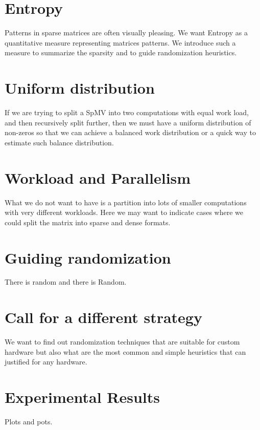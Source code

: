 \documentclass[manuscript,screen]{acmart}
\begin{document}
\section{Entropy}
Patterns in sparse matrices are often visually pleasing. We want
Entropy as a quantitative measure representing matrices patterns. We
introduce such a measure to summarize the sparsity and to guide
randomization heuristics.


\section{Uniform distribution}
If we are trying to split a SpMV into two computations with equal work
load, and then recursively split further, then we must have a uniform
distribution of non-zeros so that we can achieve a balanced work
distribution or a quick way to estimate such balance distribution.


\section{Workload and Parallelism}
What we do not want to have is a partition into lots of smaller
computations with very different workloads. Here we may want to
indicate cases where we could split the matrix into sparse and dense
formats.

\section{Guiding randomization}
There is random and there is Random.


\section{Call for a different strategy}
We want to find out randomization techniques that are suitable for
custom hardware but also what are the most common and simple
heuristics that can justified for any hardware.


\section{Experimental Results}

Plots and pots.


%

 

%
\end{document}
